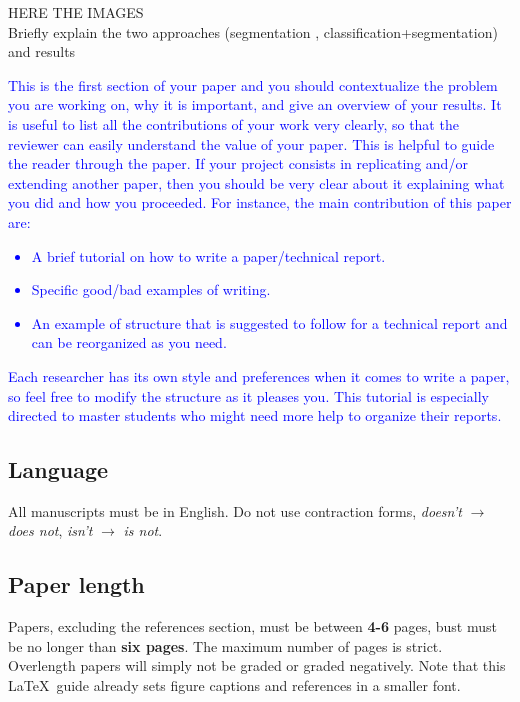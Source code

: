 \documentclass[10pt,twocolumn,letterpaper]{article}
\begin{document}
   HERE THE IMAGES\\

   Briefly explain the two approaches (segmentation , classification+segmentation) and results



\textcolor{blue}{
This is the first section of your paper and you should contextualize the problem you are working on, why it is important, and give an overview of your results. It is useful to list all the contributions of your work very clearly, so that the reviewer can easily understand the value of your paper. This is helpful to guide the reader through the paper. If your project consists in replicating and/or extending another paper, then you should be very clear about it explaining what you did and how you proceeded.
For instance, the main contribution of this paper are: 
\begin{itemize}
    \item A brief tutorial on how to write a paper/technical report.
    \item Specific good/bad examples of writing.
    \item An example of structure that is suggested to follow for a technical report and can be reorganized as you need.
\end{itemize}
Each researcher has its own style and preferences when it comes to write a paper, so feel free to modify the structure as it pleases you. 
This tutorial is especially directed to master students who might need more help to organize their reports.
}


\subsection{Language}

All manuscripts must be in English. Do not use contraction forms, \eg \emph{doesn't} $\xrightarrow{}$ \emph{does not}, \emph{isn't} $\xrightarrow{}$ \emph{is not}. 

\subsection{Paper length}
Papers, excluding the references section, must be between \textbf{4-6} pages, bust must be no longer than \textbf{six pages}. The maximum number of pages is strict. Overlength papers will simply not be graded or graded negatively. Note that this \LaTeX\ guide already sets figure captions and references in a smaller font.
\end{document}
